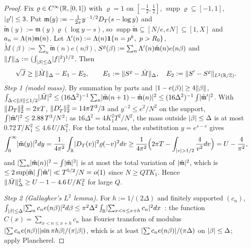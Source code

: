 \begin{proof}
Fix $\varrho\in C^\infty(\mathbb R,[0,1])$ with $\varrho=1$ on $[-\frac12,\frac12]$, $\operatorname{supp}\varrho\subseteq[-1,1]$, $\lvert \varrho'\rvert\le3$.
Put $\mathfrak m(y):=-\frac1{2\pi}y^{-1/2}D_T(s-\log y)$ and $\tilde{\mathfrak m}(y):=\mathfrak m(y)\varrho(\log y-s)$, so $\operatorname{supp}\tilde{\mathfrak m}\subseteq[N/e,eN]\subseteq[1,X]$
and $a_n=\Lambda(n)\mathfrak m(n)$. Let $\Lam'(n):=\Lam(n)\mathbf 1\{n=p^k,\ p>R_0\}$, $\tilde M(\beta):=\sum_n\tilde{\mathfrak m}(n)e(n\beta)$,
$S^\varrho(\beta):=\sum_n\Lambda'(n)\tilde{\mathfrak m}(n)e(n\beta)$ and $\lVert f\rVert_\Delta:=(\int_{\lvert \beta\rvert\le\Delta}\lvert f\rvert^2)^{1/2}$. Then
\[
\sqrt J\ge\lVert \tilde M\rVert_\Delta-E_1-E_2,\qquad E_1:=\lVert S^\varrho-\tilde M\rVert_\Delta,\quad E_2:=\lVert S'-S^\varrho\rVert_{L^2(\mathbb R/\mathbb Z)} .
\]
\emph{Step 1 (model mass).} By summation by parts and $\lvert 1-e(\beta)\rvert\ge4\lVert \beta\rVert$,
$\int_{\Delta<\lVert \beta\rVert\le1/2}\lvert \tilde M\rvert^2\le(16\Delta^2)^{-1}\sum_n\lvert \tilde{\mathfrak m}(n+1)-\tilde{\mathfrak m}(n)\rvert^2\le(16\Delta^2)^{-1}\int\lvert \tilde{\mathfrak m}'\rvert^2$. With
$\lVert D_T\rVert_2^2=2\pi T$, $\lVert D_T'\rVert_2^2=14\pi T^3/3$ and $y^{-2}\le e^2/N^2$ on the support,
$\int\lvert \tilde{\mathfrak m}'\rvert^2\le2.88\,T^3/N^2$; as $16\Delta^2=4K_1^2T^2/N^2$, the mass outside $\lvert \beta\rvert\le\Delta$ is at most $0.72\,T/K_1^2\le4.6\,U/K_1^2$.
For the total mass, the substitution $y=e^{s-v}$ gives
\[
\int_0^\infty\lvert \tilde{\mathfrak m}(y)\rvert^2dy=\frac1{4\pi^2}\int_{\mathbb R}\lvert D_T(v)\rvert^2\varrho(-v)^2dv\ge\frac1{4\pi^2}\Bigl(2\pi T-\int_{\lvert v\rvert>1/2}\frac4{v^2}dv\Bigr)=U-\frac4{\pi^2},
\]
and $\lvert \sum_n\lvert \tilde{\mathfrak m}(n)\rvert^2-\int\lvert \tilde{\mathfrak m}\rvert^2\rvert$ is at most the total variation of $\lvert \tilde{\mathfrak m}\rvert^2$, which is
$\le2\sup\lvert \tilde{\mathfrak m}\rvert\int\lvert \tilde{\mathfrak m}'\rvert\ll T^{5/2}/N=o(1)$ since $N\ge QTK_1$. Hence $\lVert \tilde M\rVert_\Delta^2\ge U-1-4.6\,U/K_1^2$ for large $Q$.

\emph{Step 2 (Gallagher's $L^2$ lemma).} For $h:=1/(2\Delta)$ and finitely supported $(c_n)$,
$\int_{\lvert \beta\rvert\le\Delta}\lvert \sum_nc_ne(n\beta)\rvert^2d\beta\le\pi^2\Delta^2\int_{\mathbb R}\lvert \sum_{x<n\le x+h}c_n\rvert^2dx$~\cite[Lemma~1]{Gal70}: the function
$C(x)=\sum_{x<n\le x+h}c_n$ has Fourier transform of modulus $\lvert \sum c_ne(n\beta)\rvert\lvert \sin\pi h\beta\rvert/(\pi\lvert \beta\rvert)$, which is at least
$\lvert \sum c_ne(n\beta)\rvert/(\pi\Delta)$ on $\lvert \beta\rvert\le\Delta$; apply Plancherel.


\end{proof}
